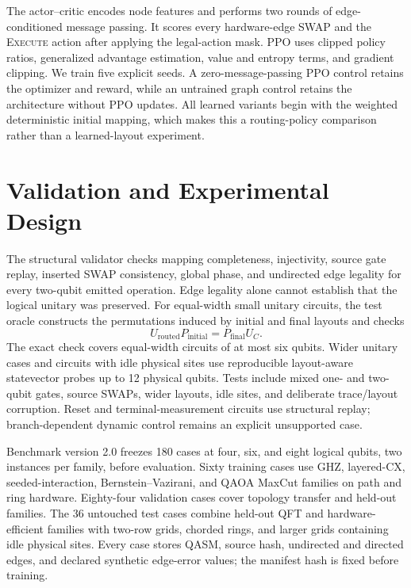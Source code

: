 \documentclass[a4paper,10pt,twocolumn]{article}
\begin{document}
The actor--critic encodes node features and performs two rounds of
edge-conditioned message passing. It scores every hardware-edge SWAP and the
\textsc{Execute} action after applying the legal-action mask. PPO uses clipped
policy ratios, generalized advantage estimation, value and entropy terms, and
gradient clipping. We train five explicit seeds. A zero-message-passing PPO
control retains the optimizer and reward, while an untrained graph control
retains the architecture without PPO updates. All learned variants begin with
the weighted deterministic initial mapping, which makes this a routing-policy
comparison rather than a learned-layout experiment.

\section{Validation and Experimental Design}
The structural validator checks mapping completeness, injectivity, source
gate replay, inserted SWAP consistency, global phase, and undirected edge
legality for every two-qubit emitted operation. Edge
legality alone cannot establish that the logical unitary was preserved.
For equal-width small unitary circuits, the test oracle constructs the
permutations induced by initial and final layouts and checks
\begin{equation}
 U_{\mathrm{routed}}P_{\mathrm{initial}}
 =P_{\mathrm{final}}U_C.
 \label{eq:equivalence}
\end{equation}
The exact check covers equal-width circuits of at most six qubits. Wider
unitary cases and circuits with idle physical sites use reproducible
layout-aware statevector probes up to 12 physical qubits. Tests include mixed
one- and two-qubit gates, source SWAPs, wider layouts, idle sites, and deliberate
trace/layout corruption. Reset and terminal-measurement circuits use structural
replay; branch-dependent dynamic control remains an explicit unsupported case.

Benchmark version 2.0 freezes 180 cases at four, six, and eight logical
qubits, two instances per family, before evaluation. Sixty training cases use
GHZ, layered-CX, seeded-interaction, Bernstein--Vazirani, and QAOA MaxCut
families on path and ring hardware. Eighty-four validation cases cover
topology transfer and held-out families. The 36 untouched test cases combine
held-out QFT and hardware-efficient families with two-row grids,
chorded rings, and larger grids containing idle physical sites. Every case
stores QASM, source hash, undirected and directed edges, and declared synthetic
edge-error values; the manifest hash is fixed before training.
\end{document}
